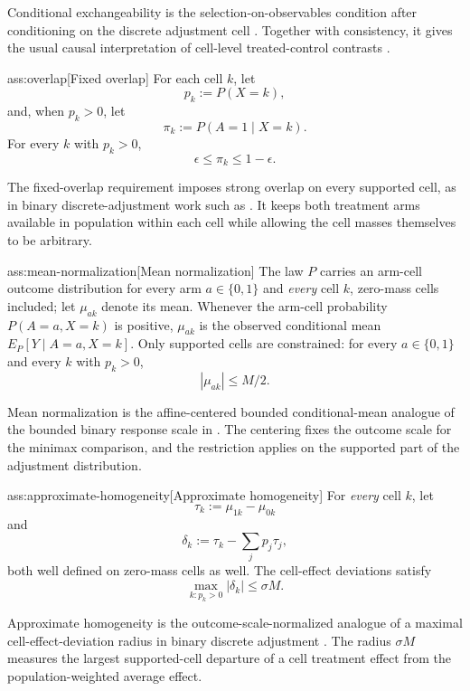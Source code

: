 Conditional exchangeability is the selection-on-observables condition after conditioning on the discrete adjustment cell \citep{ZengBalakrishnanHanKennedy2024}. Together with consistency, it gives the usual causal interpretation of cell-level treated-control contrasts \citep{Rubin1974,RosenbaumRubin1983,ImbensRubin2015}.

\begin{assumptionv}{ass:overlap}[Fixed overlap]
For each cell \(k\), let
\[
p_k:=P(X=k),
\]
and, when \(p_k>0\), let
\[
\pi_k:=P(A=1\mid X=k).
\]
For every \(k\) with \(p_k>0\),
\[
\epsilon\le \pi_k\le 1-\epsilon .
\]
\end{assumptionv}

The fixed-overlap requirement imposes strong overlap on every supported cell, as in binary discrete-adjustment work such as \citet{ZengBalakrishnanHanKennedy2024}. It keeps both treatment arms available in population within each cell while allowing the cell masses themselves to be arbitrary.

\begin{assumptionv}{ass:mean-normalization}[Mean normalization]
The law \(P\) carries an arm-cell outcome distribution for every arm \(a\in\{0,1\}\) and \emph{every} cell \(k\), zero-mass cells included; let \(\mu_{ak}\) denote its mean.  Whenever the arm-cell probability \(P(A=a,X=k)\) is positive, \(\mu_{ak}\) is the observed conditional mean \(E_P[Y\mid A=a,X=k]\).  Only supported cells are constrained: for every \(a\in\{0,1\}\) and every \(k\) with \(p_k>0\),
\[
|\mu_{ak}|\le M/2 .
\]
\end{assumptionv}

Mean normalization is the affine-centered bounded conditional-mean analogue of the bounded binary response scale in \citet{ZengBalakrishnanHanKennedy2024}. The centering fixes the outcome scale for the minimax comparison, and the restriction applies on the supported part of the adjustment distribution.

\begin{assumptionv}{ass:approximate-homogeneity}[Approximate homogeneity]
For \emph{every} cell \(k\), let
\[
\tau_k:=\mu_{1k}-\mu_{0k}
\]
and
\[
\delta_k:=\tau_k-\sum_j p_j\tau_j ,
\]
both well defined on zero-mass cells as well.
The cell-effect deviations satisfy
\[
\max_{k:p_k>0}|\delta_k|\le \sigma M .
\]
\end{assumptionv}

Approximate homogeneity is the outcome-scale-normalized analogue of a maximal cell-effect-deviation radius in binary discrete adjustment \citep{ZengBalakrishnanHanKennedy2024}. The radius \(\sigma M\) measures the largest supported-cell departure of a cell treatment effect from the population-weighted average effect.

